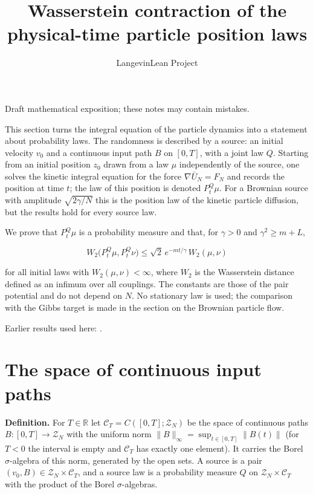 \documentclass[11pt,a4paper]{article}
\title{\texorpdfstring{Wasserstein contraction of the physical-time particle position laws}{Wasserstein contraction of the physical-time particle position laws}}
\author{LangevinLean Project}
\date{}
\begin{document}
\maketitle
Draft mathematical exposition; these notes may contain mistakes.


This section turns the integral equation of the particle dynamics into a statement about probability laws. The randomness is described by a source: an initial velocity \(v_0\) and a continuous input path \(B\) on \([0,T]\), with a joint law \(Q\). Starting from an initial position \(z_0\) drawn from a law \(\mu\) independently of the source, one solves the kinetic integral equation for the force \(\nabla\bar U_N=F_N\) and records the position at time \(t\); the law of this position is denoted \(P^Q_t\mu\). For a Brownian source with amplitude \(\sqrt{2\gamma/N}\) this is the position law of the kinetic particle diffusion, but the results hold for every source law.




We prove that \(P^Q_t\mu\) is a probability measure and that, for \(\gamma>0\) and \(\gamma^2\ge m+L\),


\[W_2\bigl(P^Q_t\mu,P^Q_t\nu\bigr)\le\sqrt2\,e^{-mt/\gamma}\,W_2(\mu,\nu)\]


for all initial laws with \(W_2(\mu,\nu)<\infty\), where \(W_2\) is the Wasserstein distance defined as an infimum over all couplings. The constants are those of the pair potential and do not depend on \(N\). No stationary law is used; the comparison with the Gibbs target is made in the section on the Brownian particle flow.



Earlier results used here: \cite[Section~3.9]{LangevinLean2026Kinetic}.

\section{\texorpdfstring{The space of continuous input paths}{The space of continuous input paths}}


\textbf{Definition.} For \(T\in\mathbb R\) let \(\mathcal C_T=C([0,T];\mathcal Z_N)\) be the space of continuous paths \(B:[0,T]\to\mathcal Z_N\) with the uniform norm \(\|B\|_\infty=\sup_{t\in[0,T]}\|B(t)\|\) (for \(T<0\) the interval is empty and \(\mathcal C_T\) has exactly one element). It carries the Borel \(\sigma\)-algebra of this norm, generated by the open sets. A source is a pair \((v_0,B)\in\mathcal Z_N\times\mathcal C_T\), and a source law is a probability measure \(Q\) on \(\mathcal Z_N\times\mathcal C_T\) with the product of the Borel \(\sigma\)-algebras.
\end{document}
